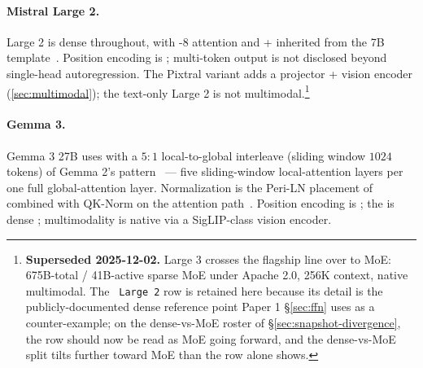\paragraph{Mistral Large 2.}
 Large 2 is dense  throughout, with -8 attention and
 +  inherited from the  7B
template~\citep[\S 2]{jiang2023}.
Position encoding is ; multi-token output is not disclosed beyond
single-head autoregression. The Pixtral variant adds a projector +
vision encoder (\cref{sec:multimodal}); the text-only  Large
2 is not multimodal.\footnote{\textbf{Superseded 2025-12-02.}
 Large 3 \citep{mistral-large3-2025} crosses the
 flagship line over to MoE: 675B-total / 41B-active sparse
MoE under Apache 2.0, 256K context, native multimodal. The
\texttt{ Large 2} row is retained here because its detail is
the publicly-documented dense reference point Paper 1 \S\ref{sec:ffn}
uses as a counter-example; on the dense-vs-MoE roster of
\S\ref{sec:snapshot-divergence}, the  row should now be read
as MoE going forward, and the dense-vs-MoE split tilts further
toward MoE than the row alone shows.}

\paragraph{Gemma 3.}
Gemma 3 27B uses  with a $5{:}1$ local-to-global interleave (sliding
window $1024$ tokens) of Gemma 2's pattern~\citep[\S 2.1]{gemma3} --- five
sliding-window local-attention layers per one full global-attention layer. Normalization
is the Peri-LN placement of \citet{peri-ln2025} combined with QK-Norm
on the attention path~\citep[\S 2.1]{gemma3,olmo2}. Position encoding
is ; the  is dense ; multimodality is native via a
SigLIP-class vision
encoder.

